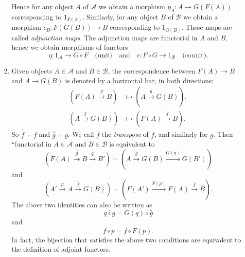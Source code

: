 \begin{remark}
\begin{enumerate}
 Hence for any object $A$ of $\mathscr{A}$ we obtain a morphism $\eta _A:A\to G(F(A))$ corresponding to $1_{F(A)}$. Similarly, for any object $B$ of $\mathscr{B}$ we obtain a morphism $\epsilon _B:F(G(B))\to B$ corresponding to $1_{G(B)}$. These maps are called  \textit{adjunction maps}. The adjunction maps are functorial in $A$ and $B$, hence we obtain morphisms of functors
\[
  \eta:1_{\mathscr{A}}\to G\circ F\quad \text{(unit)} \quad \text{and}\quad \epsilon :F\circ G\to 1_{\mathscr{B}}\quad \text{(counit)}.
\] 
\item
Given objects  $A\in \mathscr{A}$ and $B\in \mathscr{B}$, the correspondence between $F(A)\to B$ and $A\to G(B)$ is denoted by a horizontal bar, in both directions:
\begin{align*}
  \left( F(A)\overset{g}{\to }B \right) &\mapsto \left( A\overset{\bar{g}}{\to }G(B) \right) ,\\
  \left( A\overset{f}{\to }G(B) \right) &\mapsto \left( F(A)\overset{\bar{f}}{\to }B \right) .\end{align*}
  So $\bar{\bar{f}}=f$ and $\bar{\bar{g}}=g$. We call  $\bar{f}$ the  \textit{transpose} of $f$, and similarly for $g$. Then ``functorial in $A\in \mathscr{A}$ and $B\in \mathscr{B}$ is equivalent to 
  \begin{equation}
    \overline{\left( F(A)\xrightarrow{g}B\xrightarrow{q}B' \right) }=\left( A\xrightarrow{\bar{g}}G(B)\xrightarrow{G(q)}G(B') \right) \label{adj-1}
  \end{equation}
  and 
  \begin{equation}
    \overline{\left( A'\xrightarrow{p}A\xrightarrow{f}G(B) \right) }=\left( F(A')\xrightarrow{F(p)}F(A)\xrightarrow{\bar{f}}B \right). \label{adj-2}
  \end{equation}
  The above two identities can also be written as
  \begin{equation}
    \overline{q\circ g}=G(q)\circ \bar{g}
  \end{equation}
  and
  \begin{equation}
    \overline{f\circ p}=\bar{f}\circ F(p).
  \end{equation}
  In fact, the bijection that satisfies the above two conditions are equivalent to the definition of adjoint functors.
\end{enumerate}
\end{remark}

